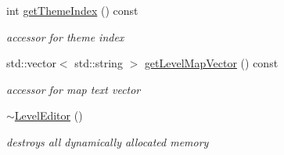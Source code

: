 \begin{DoxyCompactItemize}
int \hyperlink{class_level_editor_aa52b52d95742ff2f9b23bc95482b1336}{get\+Theme\+Index} () const
\begin{DoxyCompactList}\small\item\em accessor for theme index \end{DoxyCompactList}\item 
\hypertarget{class_level_editor_ae60797218578c738c78d56d33971f113}{}\label{class_level_editor_ae60797218578c738c78d56d33971f113} 
std\+::vector$<$ std\+::string $>$ \hyperlink{class_level_editor_ae60797218578c738c78d56d33971f113}{get\+Level\+Map\+Vector} () const
\begin{DoxyCompactList}\small\item\em accessor for map text vector \end{DoxyCompactList}\item 
\hypertarget{class_level_editor_a2fdfaad257e235e2f392b08fabee79ec}{}\label{class_level_editor_a2fdfaad257e235e2f392b08fabee79ec} 
\hyperlink{class_level_editor_a2fdfaad257e235e2f392b08fabee79ec}{$\sim$\+Level\+Editor} ()
\begin{DoxyCompactList}\small\item\em destroys all dynamically allocated memory \end{DoxyCompactList}\end{DoxyCompactItemize}
